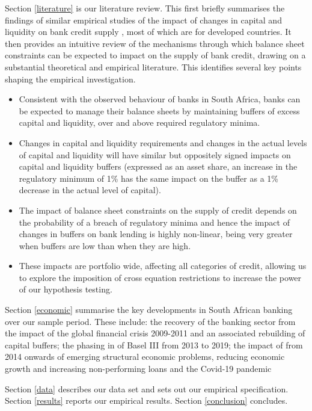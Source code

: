 \documentclass[
  12,
]{article}
\begin{document}
Section \ref{literature} is our literature review. This first briefly summarises the findings of similar empirical studies of the impact of changes in capital and liquidity on bank credit supply , most of which are for developed countries. It then provides an intuitive review of the mechanisms through which balance sheet constraints can be expected to impact on the supply of bank credit, drawing on a substantial theoretical and empirical literature. This identifies several key points shaping the empirical investigation.

\begin{itemize}
    \item Consistent with the observed behaviour of banks in South Africa, banks can be expected to manage their balance sheets by maintaining buffers of excess capital and liquidity, over and above required regulatory minima.
    \item Changes in capital and liquidity requirements and changes in the actual levels of capital and liquidity will have similar but oppositely signed impacts on capital and liquidity buffers (expressed as an asset share, an increase in the regulatory minimum of 1\% has the same impact on the buffer as a 1\% decrease in the actual level of capital). 
    \item The impact of balance sheet constraints on the supply of credit depends on the probability of a breach of regulatory minima and hence the impact of changes in buffers on bank lending is highly non-linear, being very greater when buffers are low than when they are high. 
    \item These impacts are portfolio wide, affecting all categories of credit, allowing us to explore the imposition of cross equation restrictions to increase the power of our hypothesis testing.  
\end{itemize}

Section \ref{economic} summarise the key developments in South African banking over our sample period. These include: the recovery of the banking sector from the impact of the global financial crisis 2009-2011 and an associated rebuilding of capital buffers; the phasing in of Basel III from 2013 to 2019; the impact of from 2014 onwards of emerging structural economic problems, reducing economic growth and increasing non-performing loans and the Covid-19 pandemic

Section \ref{data} describes our data set and sets out our empirical specification. Section \ref{results} reports our empirical results. Section \ref{conclusion} concludes.
\end{document}

